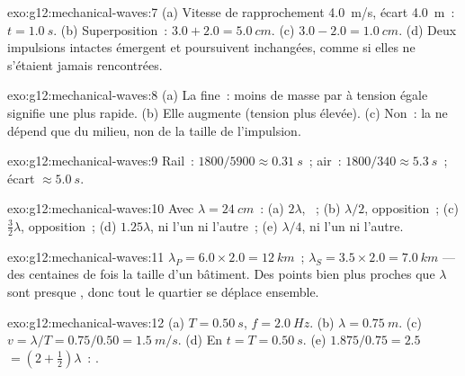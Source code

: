 \begin{solution}{exo:g12:mechanical-waves:7}
(a) Vitesse de rapprochement \qty{4.0}{m/s}, écart \qty{4.0}{m}~: $t = \qty{1.0}{s}$.
(b) Superposition~: $3.0 + 2.0 = \qty{5.0}{cm}$.
(c) $3.0 - 2.0 = \qty{1.0}{cm}$. (d) Deux impulsions intactes émergent et
poursuivent inchangées, comme si elles ne s'étaient jamais rencontrées.
\end{solution}

\begin{solution}{exo:g12:mechanical-waves:8}
(a) La fine~: moins de masse par  à tension égale
signifie une  plus rapide. (b) Elle augmente (tension plus
élevée). (c) Non~: la  ne dépend que du milieu, non de la taille
de l'impulsion.
\end{solution}

\begin{solution}{exo:g12:mechanical-waves:9}
Rail~: $1800/5900 \approx \qty{0.31}{s}$~; air~:
$1800/340 \approx \qty{5.3}{s}$~; écart $\approx \qty{5.0}{s}$.
\end{solution}

\begin{solution}{exo:g12:mechanical-waves:10}
Avec $\lambda = \qty{24}{cm}$~: (a) $2\lambda$, ~;
(b) $\lambda/2$, opposition~; (c) $\tfrac32\lambda$, opposition~;
(d) $1.25\lambda$, ni l'un ni l'autre~; (e) $\lambda/4$, ni l'un ni l'autre.
\end{solution}

\begin{solution}{exo:g12:mechanical-waves:11}
$\lambda_P = 6.0 \times 2.0 = \qty{12}{km}$~;
$\lambda_S = 3.5 \times 2.0 = \qty{7.0}{km}$ --- des centaines de fois
la taille d'un bâtiment. Des points bien plus proches que $\lambda$ sont
presque , donc tout le quartier se déplace ensemble.
\end{solution}

\begin{solution}{exo:g12:mechanical-waves:12}
(a) $T = \qty{0.50}{s}$, $f = \qty{2.0}{Hz}$.
(b) $\lambda = \qty{0.75}{m}$.
(c) $v = \lambda/T = 0.75/0.50 = \qty{1.5}{m/s}$.
(d) En $t = T = \qty{0.50}{s}$. (e) $1.875/0.75 = 2.5$ 
$= (2 + \tfrac12)\lambda$~: .
\end{solution}

